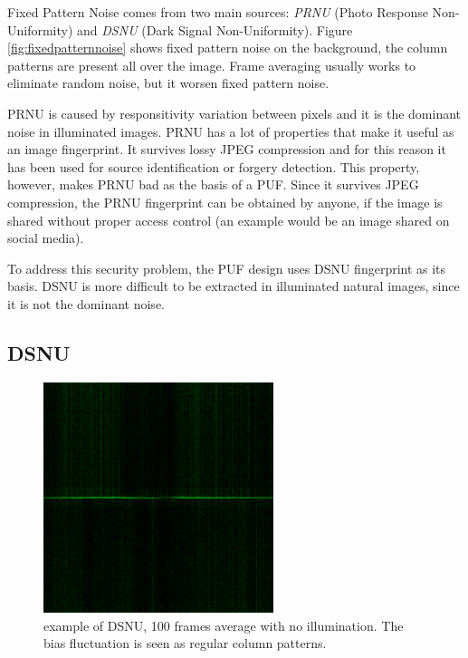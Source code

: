 Fixed Pattern Noise comes from two main sources: \textit{PRNU} (Photo Response Non-Uniformity) and \textit{DSNU} (Dark Signal Non-Uniformity).
Figure \ref{fig:fixedpatternnoise} shows fixed pattern noise on the background, the column patterns are present all over the image. Frame averaging usually works to eliminate random noise, but it worsen fixed pattern noise.

PRNU is caused by responsitivity variation between pixels and it is the dominant noise in illuminated images. PRNU has a lot of properties that make it useful as an image fingerprint.
It survives lossy JPEG compression and for this reason it has been used for source identification or forgery detection. This property, however, makes PRNU bad as the basis of a PUF.
Since it survives JPEG compression, the PRNU fingerprint can be obtained by anyone, if the image is shared without proper access control (an example would be an image shared on social media).

To address this security problem, the PUF design uses DSNU fingerprint as its basis. DSNU is more difficult to be extracted in illuminated natural images, since it is not the dominant noise.

\subsection{\textbf{DSNU}}
\begin{figure}[h!]                      %
    \centering
    \includegraphics[width=0.6\textwidth]{images/DSNU.png}
    \caption{example of DSNU, 100 frames average with no illumination. The bias fluctuation is seen as regular column patterns.}
    \label{fig:dsnu}
\end{figure}

